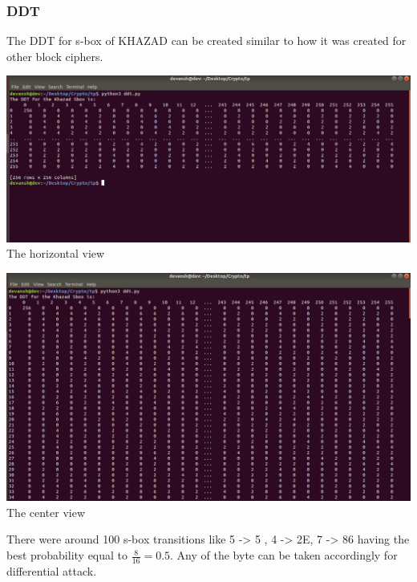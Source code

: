\documentclass[preprint]{transcrypto}
\begin{document}
\subsubsection{DDT}
The DDT for s-box of KHAZAD can be created similar to how it was created for other block ciphers.
\begin{center}
\includegraphics[scale=0.34]{Screenshots/k_ddt1.png}  \\
The horizontal view
\end{center}
\begin{center}
    \includegraphics[scale=0.34]{Screenshots/k_ddt.png}\\
    The center view
\end{center}
There were around 100 s-box transitions like 5 -> 5 ,  4 -> 2E,  7 -> 86  having the best probability equal to $\frac{8}{16} = 0.5$. Any of the byte can be taken accordingly for differential attack.
\newpage
\end{document}
